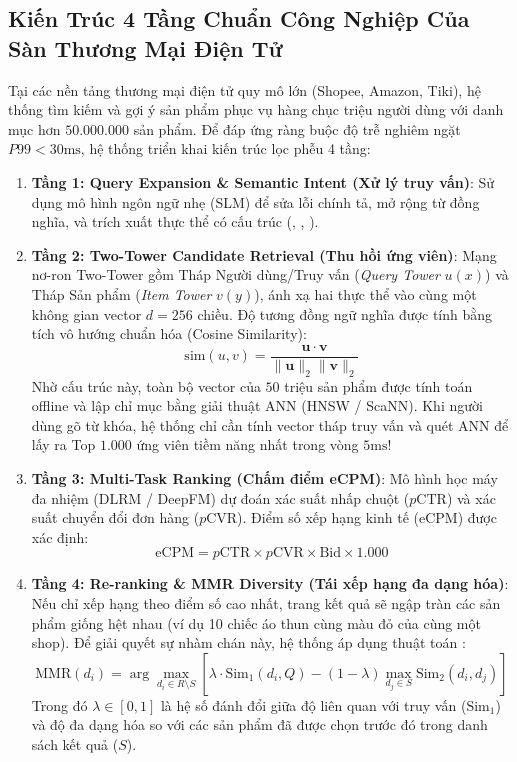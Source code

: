 \subsection{Kiến Trúc 4 Tầng Chuẩn Công Nghiệp Của Sàn Thương Mại Điện Tử}
Tại các nền tảng thương mại điện tử quy mô lớn (Shopee, Amazon, Tiki), hệ thống tìm kiếm và gợi ý sản phẩm phục vụ hàng chục triệu người dùng với danh mục hơn $50.000.000$ sản phẩm.
Để đáp ứng ràng buộc độ trễ nghiêm ngặt $P99 < 30\text{ms}$, hệ thống triển khai kiến trúc lọc phễu 4 tầng:
\begin{enumerate}
  \item \textbf{Tầng 1: Query Expansion \& Semantic Intent (Xử lý truy vấn)}:
  Sử dụng mô hình ngôn ngữ nhẹ (SLM) để sửa lỗi chính tả, mở rộng từ đồng nghĩa, và trích xuất thực thể có cấu trúc (, , ).
  \item \textbf{Tầng 2: Two-Tower Candidate Retrieval (Thu hồi ứng viên)}:
  Mạng nơ-ron Two-Tower gồm Tháp Người dùng/Truy vấn (\textit{Query Tower} $u(x)$) và Tháp Sản phẩm (\textit{Item Tower} $v(y)$), ánh xạ hai thực thể vào cùng một không gian vector $d = 256$ chiều.
  Độ tương đồng ngữ nghĩa được tính bằng tích vô hướng chuẩn hóa (Cosine Similarity):
  \begin{equation}
  \text{sim}(u, v) = \frac{\mathbf{u} \cdot \mathbf{v}}{\|\mathbf{u}\|_2 \|\mathbf{v}\|_2}
  \label{eq:two-tower-cosine}
  \end{equation}
  Nhờ cấu trúc này, toàn bộ vector của $50$ triệu sản phẩm được tính toán offline và lập chỉ mục bằng giải thuật ANN (HNSW / ScaNN). Khi người dùng gõ từ khóa, hệ thống chỉ cần tính vector tháp truy vấn và quét ANN để lấy ra Top $1.000$ ứng viên tiềm năng nhất trong vòng $5\text{ms}$!
  \item \textbf{Tầng 3: Multi-Task Ranking (Chấm điểm eCPM)}:
  Mô hình học máy đa nhiệm (DLRM / DeepFM) dự đoán xác suất nhấp chuột ($p\text{CTR}$) và xác suất chuyển đổi đơn hàng ($p\text{CVR}$). Điểm số xếp hạng kinh tế (eCPM) được xác định:
  \begin{equation}
  \text{eCPM} = p\text{CTR} \times p\text{CVR} \times \text{Bid} \times 1.000
  \label{eq:ecpm-ranking}
  \end{equation}
  \item \textbf{Tầng 4: Re-ranking \& MMR Diversity (Tái xếp hạng đa dạng hóa)}:
  Nếu chỉ xếp hạng theo điểm số cao nhất, trang kết quả sẽ ngập tràn các sản phẩm giống hệt nhau (ví dụ 10 chiếc áo thun cùng màu đỏ của cùng một shop).
  Để giải quyết sự nhàm chán này, hệ thống áp dụng thuật toán :
  \begin{equation}
  \text{MMR}(d_i) = \arg\max_{d_i \in R \setminus S} \left[ \lambda \cdot \text{Sim}_1(d_i, Q) - (1 - \lambda) \max_{d_j \in S} \text{Sim}_2(d_i, d_j) \right]
  \label{eq:mmr-formula}
  \end{equation}
  Trong đó $\lambda \in [0, 1]$ là hệ số đánh đổi giữa độ liên quan với truy vấn ($\text{Sim}_1$) và độ đa dạng hóa so với các sản phẩm đã được chọn trước đó trong danh sách kết quả ($S$).
\end{enumerate}

